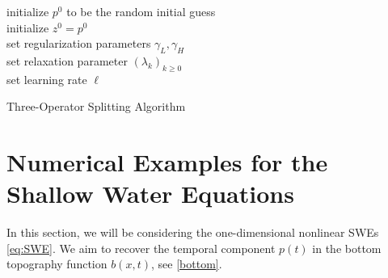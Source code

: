 \begin{algorithm}[H]
\SetAlgoLined
 initialize $p^0$ to be the random initial guess\; \\
 initialize $z^0 = p^0$ \; \\
 set regularization parameters $\gamma_L, \gamma_H$\; \\
 set relaxation parameter $(\lambda_k)_{k\geq 0}$\; \\
 set learning rate $\ell$\; \\
 \caption{Three-Operator Splitting Algorithm}
 \label{alg_oper_splitting}
\end{algorithm}





\section{Numerical Examples for the Shallow Water Equations} \label{sec_examples_swe}
In this section, we will be considering the one-dimensional nonlinear SWEs \eqref{eq:SWE}. We aim to recover the temporal component $p(t)$ in the bottom topography function $b(x,t)$, see \eqref{bottom}. 

